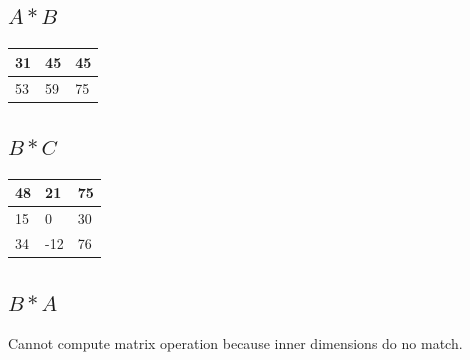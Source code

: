 \documentclass[12pt, letterpaper]{report}
\begin{document}
\subsection{$A * B$}
\begin{center}
	\begin{tabular}{ |l|l|l| } 
		\hline
		31 & 45 & 45 \\
		\hline
		53 & 59 & 75 \\
		\hline
	\end{tabular}
\end{center}

\subsection{$B * C$}
\begin{center}
	\begin{tabular}{ |l|l|l| } 
		\hline
		48 & 21 & 75 \\
		\hline
		15 & 0 & 30 \\
		\hline
		34 & -12 & 76 \\
		\hline
	\end{tabular}
\end{center}

\subsection{$B * A$}
Cannot compute matrix operation because inner dimensions do no match.
\end{document}
